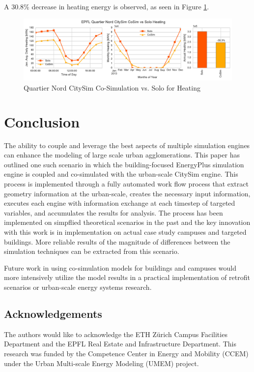 \documentclass{tBPS2e}
\theoremstyle{plain}
\theoremstyle{definition}
\theoremstyle{remark}
\begin{document}
A 30.8\% decrease in heating energy is observed, as seen in Figure \ref{fig:qn_citysim_cosimvssolo_heating}.


\begin{figure}[H]
\centering
\includegraphics[scale=0.55]{figures/QN_CitySim_Heating}
\caption{Quartier Nord CitySim Co-Simulation vs. Solo for Heating}
\label{fig:qn_citysim_cosimvssolo_heating}
\end{figure}


\section{Conclusion}
The ability to couple and leverage the best aspects of multiple simulation engines can enhance the modeling of large scale urban agglomerations. This paper has outlined one such scenario in which the building-focused EnergyPlus simulation engine is coupled and co-simulated with the urban-scale CitySim engine. This process is implemented through a fully automated work flow process that extract geometry information at the urban-scale, creates the necessary input information, executes each engine with information exchange at each timestep of targeted variables, and accumulates the results for analysis. The process has been implemented on simpflied theoretical scenarios in the past and the key innovation with this work is in implementation on actual case study campuses and targeted buildings. More reliable results of the magnitude of differences between the simulation techniques can be extracted from this scenario.

Future work in using co-simulation models for buildings and campuses would more intensively utilize the model results in a practical implementation of retrofit scenarios or urban-scale energy systems research. 

\subsection{Acknowledgements}

The authors would like to acknowledge the ETH Z\"urich Campus Facilities Department and the EPFL Real Estate and Infrastructure Department. This research was funded by the Competence Center in Energy and Mobility (CCEM) under the Urban Multi-scale Energy Modeling (UMEM) project.



\end{document}
